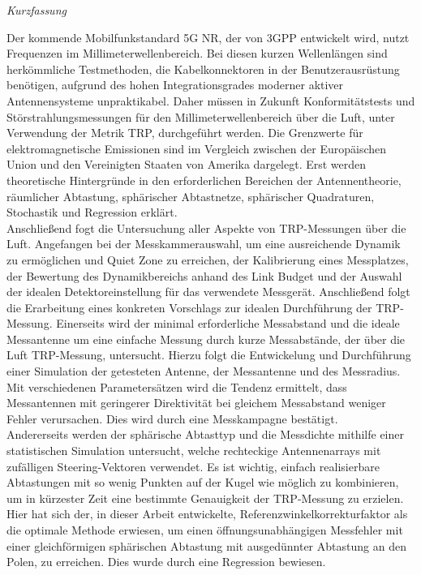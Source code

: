 

\newpage
\thispagestyle{empty}
\begin{center}
\Huge\emph{Kurzfassung}
\end{center}
\medskip
\noindent

Der kommende Mobilfunkstandard 5G NR, der von 3GPP entwickelt wird, nutzt Frequenzen im Millimeterwellenbereich.
Bei diesen kurzen Wellenlängen sind herkömmliche Testmethoden, die Kabelkonnektoren in der Benutzerausrüstung benötigen, aufgrund des hohen Integrationsgrades moderner aktiver Antennensysteme unpraktikabel.
Daher müssen in Zukunft Konformitätstests und Störstrahlungsmessungen für den Millimeterwellenbereich über die Luft, unter Verwendung der Metrik TRP, durchgeführt werden.
Die Grenzwerte für elektromagnetische Emissionen sind im Vergleich zwischen der Europäischen Union und den Vereinigten Staaten von Amerika dargelegt.
Erst werden theoretische Hintergründe in den erforderlichen Bereichen der Antennentheorie, räumlicher Abtastung, sphärischer Abtastnetze, sphärischer Quadraturen, Stochastik und Regression erklärt.\\

Anschließend fogt die Untersuchung aller Aspekte von TRP-Messungen über die Luft.
Angefangen bei der Messkammerauswahl, um eine ausreichende Dynamik zu ermöglichen und Quiet Zone zu erreichen, der Kalibrierung eines Messplatzes, der Bewertung des Dynamikbereichs anhand des Link Budget und der Auswahl der idealen Detektoreinstellung für das verwendete Messgerät.
Anschließend folgt die Erarbeitung eines konkreten Vorschlags zur idealen Durchführung der TRP-Messung.
Einerseits wird der minimal erforderliche Messabstand und die ideale Messantenne um eine einfache Messung durch kurze Messabstände, der über die Luft TRP-Messung, untersucht.
Hierzu folgt die Entwickelung und Durchführung einer Simulation der getesteten Antenne, der Messantenne und des Messradius.
Mit verschiedenen Parametersätzen wird die Tendenz ermittelt, dass Messantennen mit geringerer Direktivität bei gleichem Messabstand weniger Fehler verursachen. Dies wird durch eine Messkampagne bestätigt.\\

Andererseits werden der sphärische Abtasttyp und die Messdichte mithilfe einer statistischen Simulation untersucht, welche rechteckige Antennenarrays mit zufälligen Steering-Vektoren verwendet.
Es ist wichtig, einfach realisierbare Abtastungen mit so wenig Punkten auf der Kugel wie möglich zu kombinieren, um in kürzester Zeit eine bestimmte Genauigkeit der TRP-Messung zu erzielen.
Hier hat sich der, in dieser Arbeit entwickelte, Referenzwinkelkorrekturfaktor als die optimale Methode erwiesen, um einen öffnungsunabhängigen Messfehler mit einer gleichförmigen sphärischen Abtastung mit ausgedünnter Abtastung an den Polen, zu erreichen.
Dies wurde durch eine Regression bewiesen.
